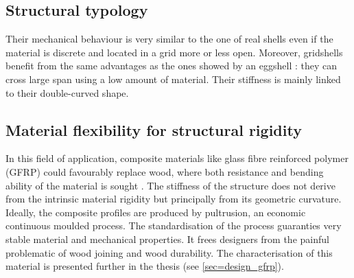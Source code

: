 

\subsection{Structural typology}\label{sec=def_topo}
Their mechanical behaviour is very similar to the one of real shells even if the material is discrete and located in a grid more or less open. Moreover, gridshells benefit from the same advantages as the ones showed by an eggshell : they can cross large span using a low amount of material. Their stiffness is mainly linked to their double-curved shape.

\subsection{Material flexibility for structural rigidity}\label{sec=def_flexibility}
In this field of application, composite materials like glass fibre reinforced polymer (GFRP) could favourably replace wood, where both resistance and bending ability of the material is sought \cite{Douthe2010a}. The stiffness of the structure does not derive from the intrinsic material rigidity but principally from its geometric curvature. Ideally, the composite profiles are produced by pultrusion, an economic continuous moulded process. The standardisation of the process guaranties very stable material and mechanical properties. It frees designers from the painful problematic of wood joining and wood durability. The characterisation of this material is presented further in the thesis (see \cref{sec=design_gfrp}).


